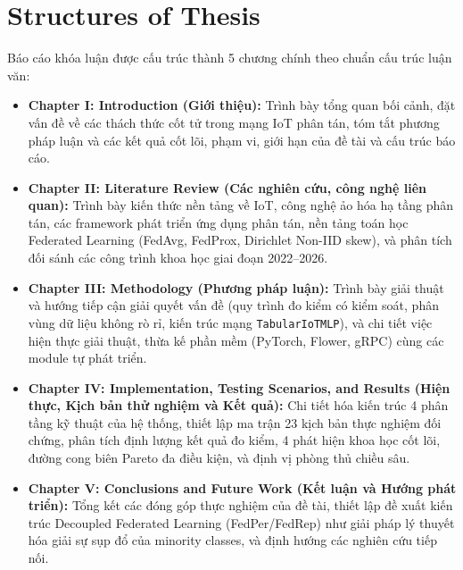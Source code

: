 \section{Structures of Thesis}
\label{sec:intro_structures}
Báo cáo khóa luận được cấu trúc thành 5 chương chính theo chuẩn cấu trúc luận văn:
\begin{itemize}
    \item \textbf{Chapter I: Introduction (Giới thiệu):} Trình bày tổng quan bối cảnh, đặt vấn đề về các thách thức cốt tử trong mạng IoT phân tán, tóm tắt phương pháp luận và các kết quả cốt lõi, phạm vi, giới hạn của đề tài và cấu trúc báo cáo.
    \item \textbf{Chapter II: Literature Review (Các nghiên cứu, công nghệ liên quan):} Trình bày kiến thức nền tảng về IoT, công nghệ ảo hóa hạ tầng phân tán, các framework phát triển ứng dụng phân tán, nền tảng toán học Federated Learning (FedAvg, FedProx, Dirichlet Non-IID skew), và phân tích đối sánh các công trình khoa học giai đoạn 2022--2026.
    \item \textbf{Chapter III: Methodology (Phương pháp luận):} Trình bày giải thuật và hướng tiếp cận giải quyết vấn đề (quy trình đo kiểm có kiểm soát, phân vùng dữ liệu không rò rỉ, kiến trúc mạng \texttt{TabularIoTMLP}), và chi tiết việc hiện thực giải thuật, thừa kế phần mềm (PyTorch, Flower, gRPC) cùng các module tự phát triển.
    \item \textbf{Chapter IV: Implementation, Testing Scenarios, and Results (Hiện thực, Kịch bản thử nghiệm và Kết quả):} Chi tiết hóa kiến trúc 4 phân tầng kỹ thuật của hệ thống, thiết lập ma trận 23 kịch bản thực nghiệm đối chứng, phân tích định lượng kết quả đo kiểm, 4 phát hiện khoa học cốt lõi, đường cong biên Pareto đa điều kiện, và định vị phòng thủ chiều sâu.
    \item \textbf{Chapter V: Conclusions and Future Work (Kết luận và Hướng phát triển):} Tổng kết các đóng góp thực nghiệm của đề tài, thiết lập đề xuất kiến trúc Decoupled Federated Learning (FedPer/FedRep) như giải pháp lý thuyết hóa giải sự sụp đổ của minority classes, và định hướng các nghiên cứu tiếp nối.
\end{itemize}
